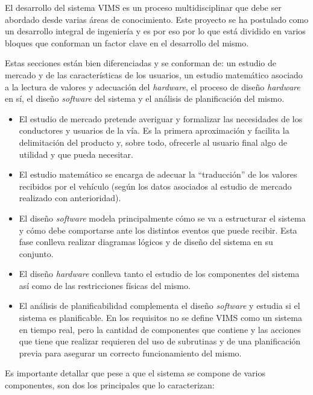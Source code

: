 El desarrollo del sistema \ac{VIMS} es un proceso multidisciplinar que debe ser
abordado desde varias áreas de conocimiento. Este proyecto se ha postulado como
un desarrollo integral de ingeniería y es por eso por lo que está dividido en
varios bloques que conforman un factor clave en el desarrollo del mismo.

Estas secciones están bien diferenciadas y se conforman de: un estudio de mercado y de
las características de los usuarios, un estudio matemático asociado a la lectura de
valores y adecuación del \textit{hardware}, el proceso de diseño \textit{hardware}
en sí, el diseño \textit{software} del sistema y el análisis de planificación del mismo.

\begin{itemize}
  \item El estudio de mercado pretende averiguar y formalizar las necesidades de los
  conductores y usuarios de la vía. Es la primera aproximación y facilita la
  delimitación del producto y, sobre todo, ofrecerle al usuario final algo de utilidad
  y que pueda necesitar.
  \item El estudio matemático se encarga de adecuar la ``traducción'' de los
  valores recibidos por el vehículo (según los datos asociados al estudio de mercado
  realizado con anterioridad).
  \item El diseño \textit{software} modela principalmente cómo se va a estructurar
  el sistema y cómo debe comportarse ante los distintos eventos que puede recibir.
  Esta fase conlleva realizar diagramas lógicos y de diseño del sistema en su conjunto.
  \item El diseño \textit{hardware} conlleva tanto el estudio de los componentes del
  sistema así como de las restricciones físicas del mismo.
  \item El análisis de planificabilidad complementa el diseño \textit{software}
  y estudia si el sistema es planificable. En los requisitos no se define \ac{VIMS}
  como un sistema en tiempo real, pero la cantidad de componentes que contiene y las
  acciones que tiene que realizar requieren del uso de subrutinas y de una planificación
  previa para asegurar un correcto funcionamiento del mismo.
\end{itemize}

Es importante detallar que pese a que el sistema se compone de varios componentes,
son dos los principales que lo caracterizan:


